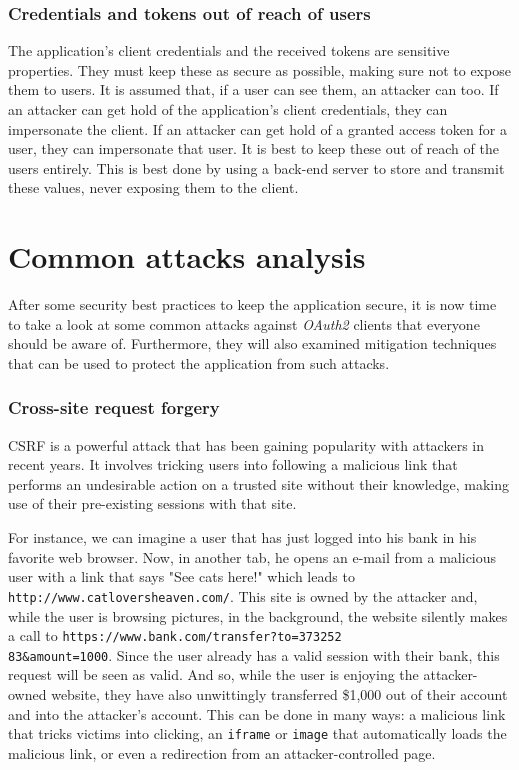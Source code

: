 \subsubsection{Credentials and tokens out of reach of users}
The application's client credentials and the received tokens are sensitive properties. They must keep these as secure as possible, making sure not to expose them to users. It is assumed that, if a user can see them, an attacker can too. If an attacker can get hold of the application's client credentials, they can impersonate the client. If an attacker can get hold of a granted access token for a user, they can impersonate that user. It is best to keep these out of reach of the users entirely. This is best done by using a back-end server to store and transmit these values, never exposing them to the client.

\section{Common attacks analysis}
\label{csrf}
After some security best practices to keep the application secure, it is now time to take a look at some common attacks against \textit{OAuth2} clients that everyone should be aware of. Furthermore, they will also examined mitigation techniques that can be used to protect the application from such attacks.

\subsubsection{Cross-site request forgery}
CSRF is a powerful attack that has been gaining popularity with attackers in recent years. It involves tricking users into following a malicious link that performs an undesirable action on a trusted site without their knowledge, making use of their pre-existing sessions with that site.

For instance, we can imagine a user that has just logged into his bank in his favorite web browser. Now, in another tab, he opens an e-mail from a malicious user with a link that says "See cats here!" which leads to \texttt{http://www.catloversheaven.com/}.
This site is owned by the attacker and, while the user is browsing pictures, in the background, the website silently makes a call to \texttt{https://www.bank.com/transfer?to=373252 \\ 83\&amount=1000}.
Since the user already has a valid session with their bank, this request will be seen as valid. And so, while the user is enjoying the attacker-owned website, they have also unwittingly transferred \$1,000 out of their account and into the
attacker's account. This can be done in many ways: a malicious link that tricks victims into clicking, an \texttt{iframe} or \texttt{image} that automatically loads the malicious link, or even a redirection from an attacker-controlled page.

